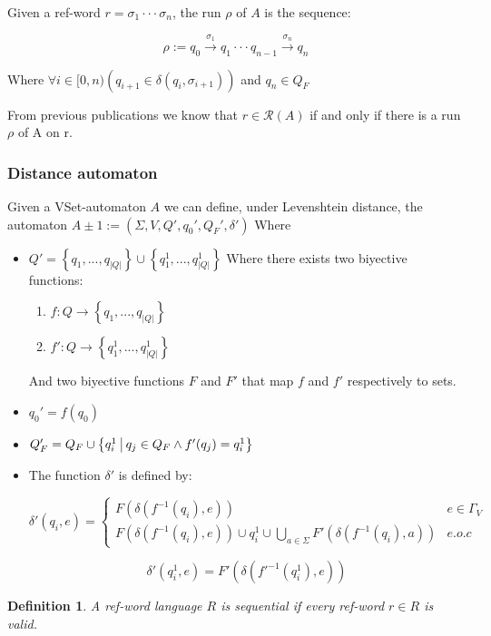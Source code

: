 \documentclass{article}
\newcommand{\abs}[1]{\left|#1\right|}
\newcommand{\set}[1]{\left\{#1\right\}}
\newcommand{\paren}[1]{\left(#1\right)}
\newcommand{\st}{\ \vline \ }
\newcommand{\trans}[1]{\overset{#1}{\longrightarrow}}
\newcommand{\ra}{\rightarrow}
\newtheorem{definition}{Definition}
\begin{document}
Given a ref-word $r = \sigma_1\cdot\cdot\cdot\sigma_n$, the run
$\rho$ of $A$ is the sequence:

\begin{equation}
    \rho:=q_0\trans{\sigma_1}q_1 \cdot\cdot\cdot q_{n-1}
    \trans{\sigma_n}q_n
\end{equation}

Where $\forall i \in [0,n)\paren{q_{i+1} \in \delta(q_i,\sigma_{i+1})}$
and $q_n\in Q_F$

From previous publications we know that $r \in \mathcal{R}(A)$ if
and only if there is a run $\rho$ of A on r.

\newpage
\subsubsection*{Distance automaton}

Given a VSet-automaton $A$ we can define, under Levenshtein distance,
the automaton $A \pm 1:= (\Sigma, V, Q', q_0', Q_F', \delta')$ Where
\begin{itemize}
    \item $Q' = \set{q_1,...,q_{\abs{Q}}} \cup \set{q^{1}_1, ...,
    q^{1}_{\abs{Q}}} $ Where there exists two biyective functions:

        \begin{enumerate}
            \item $f: Q \ra \set{q_1,...,q_{\abs{Q}}}$ 
            \item $f' : Q \ra \set{q^{1}_1, ..., q^{1}_{\abs{Q}}}$
        \end{enumerate}

	And two biyective functions $F$ and $F'$ that map $f$ and
	$f'$ respectively to sets.

    \item $q_0' = f(q_0)$

    \item $Q_F' = Q_F \cup \set{q^1_i \st q_j \in Q_F \land f'(q_j) = q_i^1}$
    \item The function $\delta'$ is defined by:

        \begin{equation*}
        \delta'(q_i, e) = 
            \begin{cases}

            F(\delta(f^{-1}(q_i), e)) & e \in \Gamma_V\\
                    F(\delta(f^{-1}(q_i), e)) \cup q_i^1\cup
                    \underset{a \in \Sigma}{\bigcup}
                    F'(\delta(f^{-1}(q_i), a)) & e.o.c

            \end{cases}
        \end{equation*}

        \begin{equation*}
            \delta'(q_i^1, e) = F'(\delta(f'^{-1}(q_i^1), e))
        \end{equation*}

\end{itemize}
\begin{definition}\label{defSequential}
    A ref-word language $R$ is sequential if every ref-word $r \in
    R$ is valid.
\end{definition}
\end{document}
